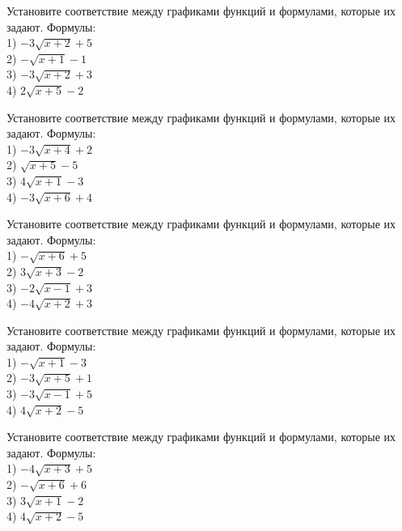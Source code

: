 \documentclass[4apaper]{article}
\begin{document}
\begin{taskBN}{11}
Установите соответствие между графиками функций и формулами, которые их задают. Формулы: \\1) $-3\sqrt{x+2}+5$\\2) $-\sqrt{x+1}-1$\\3) $-3\sqrt{x+2}+3$\\4) $2\sqrt{x+5}-2$
\end{taskBN}

\begin{taskBN}{12}
Установите соответствие между графиками функций и формулами, которые их задают. Формулы: \\1) $-3\sqrt{x+4}+2$\\2) $\sqrt{x+5}-5$\\3) $4\sqrt{x+1}-3$\\4) $-3\sqrt{x+6}+4$
\end{taskBN}

\begin{taskBN}{13}
Установите соответствие между графиками функций и формулами, которые их задают. Формулы: \\1) $-\sqrt{x+6}+5$\\2) $3\sqrt{x+3}-2$\\3) $-2\sqrt{x-1}+3$\\4) $-4\sqrt{x+2}+3$
\end{taskBN}

\begin{taskBN}{14}
Установите соответствие между графиками функций и формулами, которые их задают. Формулы: \\1) $-\sqrt{x+1}-3$\\2) $-3\sqrt{x+5}+1$\\3) $-3\sqrt{x-1}+5$\\4) $4\sqrt{x+2}-5$
\end{taskBN}

\begin{taskBN}{15}
Установите соответствие между графиками функций и формулами, которые их задают. Формулы: \\1) $-4\sqrt{x+3}+5$\\2) $-\sqrt{x+6}+6$\\3) $3\sqrt{x+1}-2$\\4) $4\sqrt{x+2}-5$
\end{taskBN}
\end{document}
